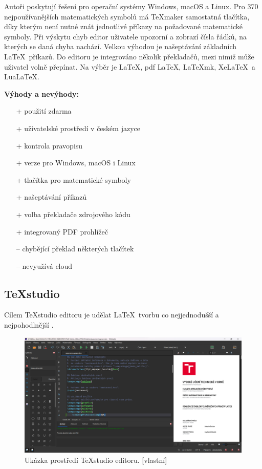 Autoři poskytují řešení pro operační systémy Windows, macOS a Linux. Pro 370 nejpoužívanějších matematických symbolů má \TeX maker samostatná tlačítka, díky kterým není nutné znát jednotlivé příkazy na požadované matematické symboly. Při výskytu chyb editor uživatele upozorní a zobrazí čísla řádků, na kterých se daná chyba nachází. Velkou výhodou je našeptávání základních \LaTeX\ příkazů. Do editoru je integrováno několik překladačů, mezi nimiž může uživatel volně přepínat. Na výběr je \LaTeX, pdf \LaTeX, \LaTeX mk, Xe\LaTeX\ a Lua\LaTeX. \cite{texmaker}

\textbf{Výhody a nevýhody:}
\begin{multicols}{2}
	\begin{itemize}
		\item [+] použití zdarma
		\item [+] uživatelské prostředí v českém jazyce
		\item [+] kontrola pravopisu
		\item [+] verze pro Windows, macOS i Linux
		\item [+] tlačítka pro matematické symboly
		\item [+] našeptávání příkazů
		\item [+] volba překladače zdrojového kódu
		\item [+] integrovaný PDF prohlížeč
	\columnbreak
		\item [--] chybějící překlad některých tlačítek
		\item [--] nevyužívá cloud
	\end{itemize}
\end{multicols}

\subsection{\TeX studio}
Cílem \TeX studio editoru je udělat \LaTeX\ tvorbu co nejjednodušší a nejpohodlnější \cite{Texstudio}.

\begin{figure}[h]
	\centering
	\includegraphics[width=\textwidth]{obrazky/texstudio.png}
	\caption[Ukázka prostředí \TeX studio editoru.]{Ukázka prostředí \TeX studio editoru. [vlastní]}
	\label{fig:texstudio}
\end{figure}

